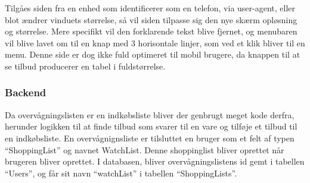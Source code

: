 Tilgåes siden fra en enhed som identificerer som en telefon, via user-agent, eller blot ændrer vinduets størrelse, så vil siden tilpasse sig den nye skærm opløsning og størrelse.
Mere specifikt vil den forklarende tekst blive fjernet, og menubaren vil blive lavet om til en knap med 3 horisontale linjer, som ved et klik bliver til en menu.
Denne side er dog ikke fuld optimeret til mobil brugere, da knappen til at se tilbud producerer en tabel i fuldstørrelse. 
\subsubsection{Backend}
Da overvågningslisten er en indkøbsliste bliver der genbrugt meget kode derfra, herunder logikken til at finde tilbud som svarer til en vare og tilføje et tilbud til en indkøbsliste. 
En overvågnignsliste er tilsluttet en bruger som et felt af typen ``ShoppingList'' og navnet WatchList. %
Denne shoppinglist bliver oprettet når brugeren bliver oprettet.
I databasen, bliver overvågningslistens id gemt i tabellen ``Users'', og får sit navn ``watchList'' i tabellen ``ShoppingLists''.

